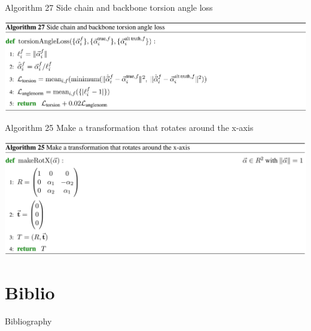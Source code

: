 \documentclass[presentation, smaller]{beamer}
\begin{document}
\begin{frame}[label={sec:org6adb546}]{Algorithm 27 Side chain and backbone torsion angle loss \cite{jumperHighlyAccurateProtein2021}}
\begin{center}
\includegraphics[width=.9\linewidth]{./imgs/sidechain-backbonetorsion-loss-algo27.png}
\end{center}
\end{frame}
\begin{frame}[label={sec:org30f2912}]{Algorithm 25 Make a transformation that rotates around the x-axis \cite{jumperHighlyAccurateProtein2021}}
\begin{center}
\includegraphics[width=.9\linewidth]{./imgs/xaxis-transform-algo.png}
\end{center}
\end{frame}
\section*{Biblio}
\label{sec:org2e8e00d}
\begin{frame}[fragile,allowframebreaks,label=]{Bibliography}
\printbibliography
\end{frame}
\end{document}
